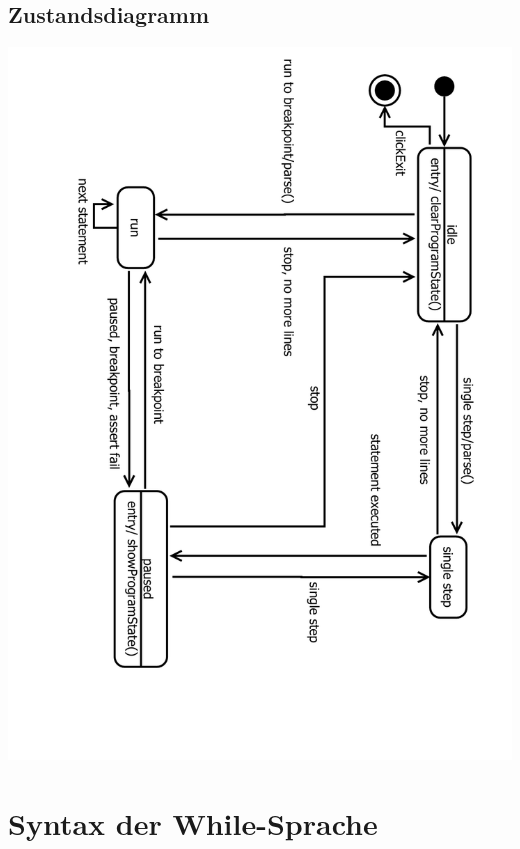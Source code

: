 \documentclass[10pt,a4paper,titlepage]{article}
\begin{document}
\subsection{Zustandsdiagramm}
\includegraphics[angle=90, scale=0.6]{images/Zustandsdiagramm.pdf}

\newpage

\section{Syntax der While-Sprache}
\end{document}
